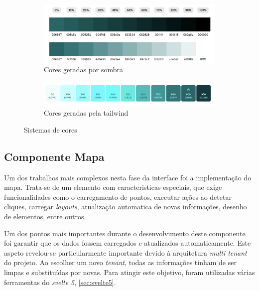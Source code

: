 \begin{figure}[!h]
	\centering
	\begin{subfigure}[c]{0.45\textwidth}
		\centering
		\includegraphics[width=\textwidth]{figs/shades.png}
		\caption{Cores geradas por sombra}
		\label{fig:shadesColors}
	\end{subfigure}
	\hfill
	\begin{subfigure}[c]{0.45\textwidth}
		\centering
		\includegraphics[width=\textwidth]{figs/tailwindGeneratedColors.png}
		\caption{Cores geradas pela tailwind}
		\label{fig:tailwindGeneratedColors}
	\end{subfigure}
	\caption{Sistemas de cores}
    \label{fig:colorSystem}
\end{figure}

\subsection{Componente Mapa}\label{sec:map_comp} %
Um dos trabalhos mais complexos nesta fase da interface foi a implementação do mapa. Trata-se de um elemento com caracteristicas especiais, que exige funcionalidades como o carregamento de pontos, executar ações ao detetar cliques, carregar \textit{layouts}, atualização automatica de novas informações, desenho de elementos, entre outros. 

Um dos pontos mais importantes durante o desenvolvimento deste componente foi garantir que os dados fossem carregados e atualizados automaticamente. Este aspeto revelou-se particularmente importante devido à arquitetura \textit{multi tenant} do projeto. Ao escolher um novo \textit{tenant}, todas as informações tinham de ser limpas e substituídas por novas. Para atingir este objetivo, foram utilizadas várias ferramentas do \textit{svelte 5}, \autoref{sec:svelte5}.

